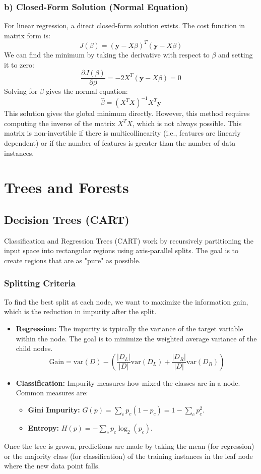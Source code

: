 \documentclass{article}
\begin{document}
\begin{multicols}{2}
\subsubsection{b) Closed-Form Solution (Normal Equation)}
For linear regression, a direct closed-form solution exists. The cost function in matrix form is:
$$ J(\beta) = (\mathbf{y} - X\beta)^T (\mathbf{y} - X\beta) $$
We can find the minimum by taking the derivative with respect to $\beta$ and setting it to zero:
$$ \frac{\partial J(\beta)}{\partial \beta} = -2X^T(\mathbf{y} - X\beta) = 0 $$
Solving for $\beta$ gives the normal equation:
$$ \hat{\beta} = (X^T X)^{-1} X^T \mathbf{y} $$
This solution gives the global minimum directly. However, this method requires computing the inverse of the matrix $X^T X$, which is not always possible. This matrix is non-invertible if there is multicollinearity (i.e., features are linearly dependent) or if the number of features is greater than the number of data instances.

\section{Trees and Forests}
\subsection{Decision Trees (CART)}
Classification and Regression Trees (CART) work by recursively partitioning the input space into rectangular regions using axis-parallel splits. The goal is to create regions that are as "pure" as possible.

\subsubsection{Splitting Criteria}
To find the best split at each node, we want to maximize the information gain, which is the reduction in impurity after the split.
\begin{itemize}
    \item \textbf{Regression:} The impurity is typically the variance of the target variable within the node. The goal is to minimize the weighted average variance of the child nodes.
    $$ \text{Gain} = \text{var}(D) - \left( \frac{|D_L|}{|D|}\text{var}(D_L) + \frac{|D_R|}{|D|}\text{var}(D_R) \right) $$
    \item \textbf{Classification:} Impurity measures how mixed the classes are in a node. Common measures are:
    \begin{itemize}
        \item \textbf{Gini Impurity:} $G(p) = \sum_{c} p_c (1-p_c) = 1 - \sum_{c} p_c^2$.
        \item \textbf{Entropy:} $H(p) = -\sum_{c} p_c \log_2(p_c)$.
    \end{itemize}
\end{itemize}
Once the tree is grown, predictions are made by taking the mean (for regression) or the majority class (for classification) of the training instances in the leaf node where the new data point falls.


\end{multicols}
\end{document}
